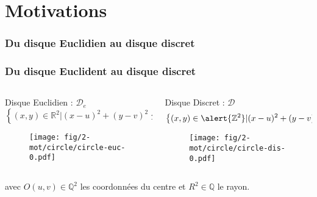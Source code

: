\section{Motivations}

\subsubsection{Du disque Euclidien au disque discret}


\begin{frame}
\frametitle{Du disque Euclident au disque discret}
{
  \begin{columns}[t]
    \begin{column}{0.5\linewidth}
      \begin{block}{Disque Euclidien : $\mathcal{D}_e$}
        $$\left\{ (x,y) \in \mathbb{R}^{2} | (x - u)^2 + (y - v)^2 \leq R^2 \right\}$$
        \begin{figure}[h!]
          \centering
          \texttt{[image: fig/2-mot/circle/circle-euc-0.pdf]}
        \end{figure}
      \end{block}
    
    \end{column}
    \begin{column}{0.5\linewidth}
      \begin{block}{Disque Discret : $\mathcal{D}$}
        $$\left\{ (x,y) \in \alert{\mathbb{Z}^{2}} | (x - u)^2 + (y - v)^2 \leq R^2 \right\}$$

        \begin{figure}[h!]
          \centering
          \texttt{[image: fig/2-mot/circle/circle-dis-0.pdf]}
        \end{figure}
      \end{block}  
    \end{column}
  \end{columns} 

  \begin{exampleblock}{}
  avec $O(u,v) \in \mathbb{Q}^{2}$ les coordonnées du centre et $R^2 \in \mathbb{Q}$ le rayon.\\
  \end{exampleblock}
}
        

\end{frame}
